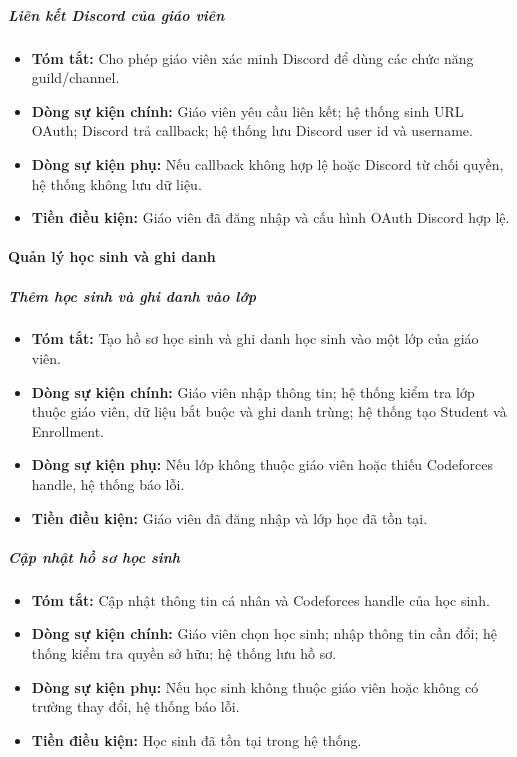 \documentclass[12pt,a4paper]{article}
\begin{document}
\subparagraph{Liên kết Discord của giáo viên}
\begin{itemize}[leftmargin=*]
\item \textbf{Tóm tắt:} Cho phép giáo viên xác minh Discord để dùng các chức năng guild/channel.
\item \textbf{Dòng sự kiện chính:} Giáo viên yêu cầu liên kết; hệ thống sinh URL OAuth; Discord trả callback; hệ thống lưu Discord user id và username.
\item \textbf{Dòng sự kiện phụ:} Nếu callback không hợp lệ hoặc Discord từ chối quyền, hệ thống không lưu dữ liệu.
\item \textbf{Tiền điều kiện:} Giáo viên đã đăng nhập và cấu hình OAuth Discord hợp lệ.
\end{itemize}

\paragraph{Quản lý học sinh và ghi danh}

\subparagraph{Thêm học sinh và ghi danh vào lớp}
\begin{itemize}[leftmargin=*]
\item \textbf{Tóm tắt:} Tạo hồ sơ học sinh và ghi danh học sinh vào một lớp của giáo viên.
\item \textbf{Dòng sự kiện chính:} Giáo viên nhập thông tin; hệ thống kiểm tra lớp thuộc giáo viên, dữ liệu bắt buộc và ghi danh trùng; hệ thống tạo Student và Enrollment.
\item \textbf{Dòng sự kiện phụ:} Nếu lớp không thuộc giáo viên hoặc thiếu Codeforces handle, hệ thống báo lỗi.
\item \textbf{Tiền điều kiện:} Giáo viên đã đăng nhập và lớp học đã tồn tại.
\end{itemize}

\subparagraph{Cập nhật hồ sơ học sinh}
\begin{itemize}[leftmargin=*]
\item \textbf{Tóm tắt:} Cập nhật thông tin cá nhân và Codeforces handle của học sinh.
\item \textbf{Dòng sự kiện chính:} Giáo viên chọn học sinh; nhập thông tin cần đổi; hệ thống kiểm tra quyền sở hữu; hệ thống lưu hồ sơ.
\item \textbf{Dòng sự kiện phụ:} Nếu học sinh không thuộc giáo viên hoặc không có trường thay đổi, hệ thống báo lỗi.
\item \textbf{Tiền điều kiện:} Học sinh đã tồn tại trong hệ thống.
\end{itemize}
\end{document}

